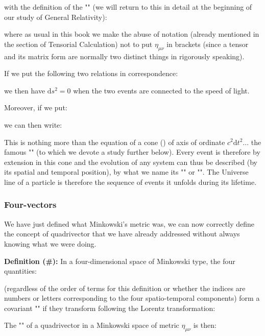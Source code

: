 	with the definition of the "" (we will return to this in detail at the beginning of our study of General Relativity):
	
	where as usual in this book we make the abuse of notation (already mentioned in the section of Tensorial Calculation) not to put $\eta_{\mu\nu}$ in brackets (since a tensor and its matrix form are normally two distinct things in rigorously speaking).

	If we put the following two relations in correspondence:
	
	we then have $\mathrm{d}s^2=0$ when the two events are connected to the speed of light.

	Moreover, if we put:
	
	we can then write:
	
	This is nothing more than the equation of a cone () of axis of ordinate $c^2\mathrm{d}t^2$... the famous "" (to which we devote a study further below). Every event is therefore by extension in this cone and the evolution of any system can thus be described (by its spatial and temporal position), by what we name its "" or "". The Universe line of a particle is therefore the sequence of events it unfolds during its lifetime.
	
	\subsubsection{Four-vectors}
	We have just defined what Minkowski's metric was, we can now correctly define the concept of quadrivector that we have already addressed without always knowing what we were doing.
	
	\textbf{Definition (\#\mydef):} In a four-dimensional space of Minkowski type, the four quantities:
	
	(regardless of the order of terms for this definition or whether the indices are numbers or letters corresponding to the four spatio-temporal components) form a covariant "" if they transform following the Lorentz transformation:	
	
	The "" of a quadrivector in a Minkowski space of metric $\eta_{\mu\nu}$ is then:
	
